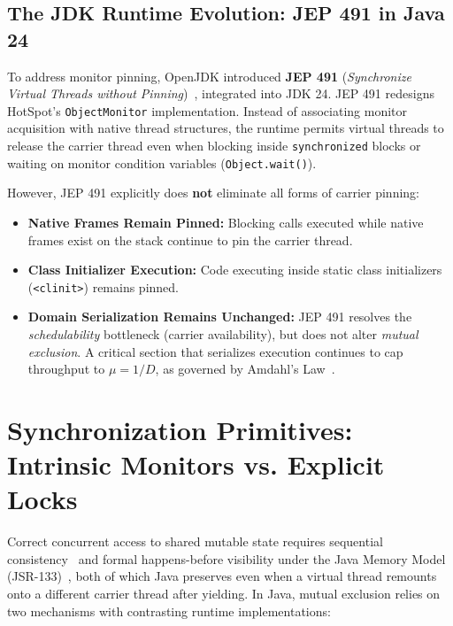 \subsection{The JDK Runtime Evolution: JEP 491 in Java 24}
To address monitor pinning, OpenJDK introduced \textbf{JEP 491} (\emph{Synchronize Virtual Threads without Pinning})~\cite{JEP491}, integrated into JDK 24. JEP 491 redesigns HotSpot's \texttt{ObjectMonitor} implementation. Instead of associating monitor acquisition with native thread structures, the runtime permits virtual threads to release the carrier thread even when blocking inside \texttt{synchronized} blocks or waiting on monitor condition variables (\texttt{Object.wait()}).

However, JEP 491 explicitly does \textbf{not} eliminate all forms of carrier pinning:
\begin{itemize}
  \item \textbf{Native Frames Remain Pinned:} Blocking calls executed while native frames exist on the stack continue to pin the carrier thread.
  \item \textbf{Class Initializer Execution:} Code executing inside static class initializers (\texttt{<clinit>}) remains pinned.
  \item \textbf{Domain Serialization Remains Unchanged:} JEP 491 resolves the \emph{schedulability} bottleneck (carrier availability), but does not alter \emph{mutual exclusion}. A critical section that serializes execution continues to cap throughput to $\mu = 1/D$, as governed by Amdahl's Law~\cite{Amdahl1967}.
\end{itemize}

\section{Synchronization Primitives: Intrinsic Monitors vs. Explicit Locks}
\label{sec:sync-primitives}

Correct concurrent access to shared mutable state requires sequential consistency~\cite{Lamport1979} and formal happens-before visibility under the Java Memory Model (JSR-133)~\cite{Manson2005}, both of which Java preserves even when a virtual thread remounts onto a different carrier thread after yielding. In Java, mutual exclusion relies on two mechanisms with contrasting runtime implementations:

